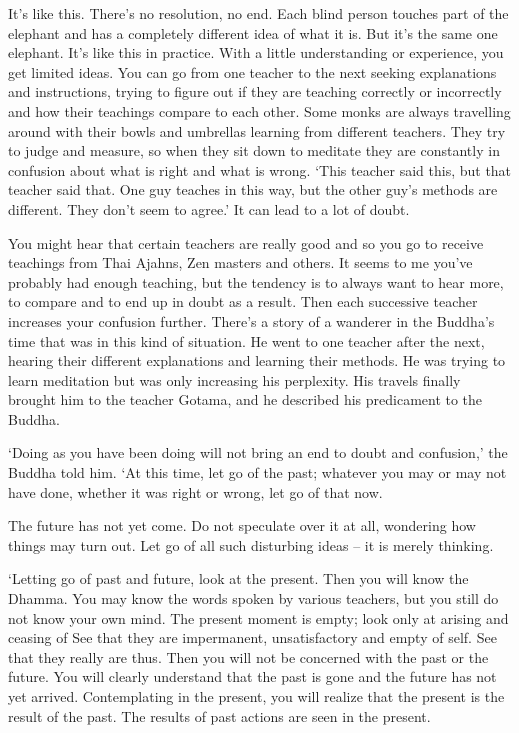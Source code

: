It's like this. There's no resolution, no end. Each blind person touches part of the elephant and has a completely different idea of what it is. But it's the same one elephant. It's like this in practice. With a little understanding or experience, you get limited ideas. You can go from one teacher to the next seeking explanations and instructions, trying to figure out if they are teaching correctly or incorrectly and how their teachings compare to each other. Some monks are always travelling around with their bowls and umbrellas learning from different teachers. They try to judge and measure, so when they sit down to meditate they are constantly in confusion about what is right and what is wrong. `This teacher said this, but that teacher said that. One guy teaches in this way, but the other guy's methods are different. They don't seem to agree.' It can lead to a lot of doubt. 

You might hear that certain teachers are really good and so you go to receive teachings from Thai Ajahns, Zen masters and others. It seems to me you've probably had enough teaching, but the tendency is to always want to hear more, to compare and to end up in doubt as a result. Then each successive teacher increases your confusion further. There's a story of a wanderer in the Buddha's time that was in this kind of situation. He went to one teacher after the next, hearing their different explanations and learning their methods. He was trying to learn meditation but was only increasing his perplexity. His travels finally brought him to the teacher Gotama, and he described his predicament to the Buddha. 

`Doing as you have been doing will not bring an end to doubt and confusion,' the Buddha told him. `At this time, let go of the past; whatever you may or may not have done, whether it was right or wrong, let go of that now. 

The future has not yet come. Do not speculate over it at all, wondering how things may turn out. Let go of all such disturbing ideas -- it is merely thinking. 

`Letting go of past and future, look at the present. Then you will know the Dhamma. You may know the words spoken by various teachers, but you still do not know your own mind. The present moment is empty; look only at arising and ceasing of  See that they are impermanent, unsatisfactory and empty of self. See that they really are thus. Then you will not be concerned with the past or the future. You will clearly understand that the past is gone and the future has not yet arrived. Contemplating in the present, you will realize that the present is the result of the past. The results of past actions are seen in the present. 

